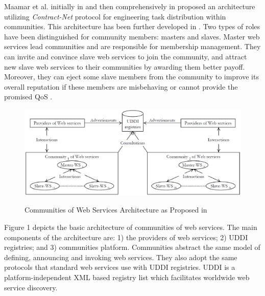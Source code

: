 Maamar et al. initially in \cite{conf/webist/MaamarLBTS07} and
then comprehensively in \cite{DBLP:journals/ijebr/MaamarSTBB09}
proposed an architecture utilizing \emph{Contract-Net} protocol
for engineering task distribution within communities. This
architecture has been further developed in
\cite{conf/IEEEscc/BenharrefSBB11, conf/IEEEscc/KhosravifarBMMT10,
conf/aina/LimTM11, CSTintercommunity}. Two types of roles have
been distinguished for community members: masters and slaves.
Master web services lead communities and are responsible for
membership management. They can invite and convince slave web
services to join the community, and attract new slave web services
to their communities by awarding them better payoff. Moreover,
they can eject some slave members from the community to improve
its overall reputation if these members are misbehaving or cannot
provide the promised QoS \cite{DBLP:journals/ijebr/MaamarSTBB09}.

        \begin{figure}
            \begin{center}
            \includegraphics[width=16cm]{Figures/wsarch.eps}\label{wsarch}
            \caption{Communities of Web Services Architecture as Proposed in \cite{DBLP:journals/ijebr/MaamarSTBB09}}
            \end{center}
        \end{figure}

Figure 1 %
depicts the basic architecture of
communities of web services. The main components of the
architecture are: 1) the providers of web services; 2) UDDI
registries; and 3) communities platform. Communities abstract the
same model of defining, announcing and invoking web services. They
also adopt the same protocols that standard web services use with
UDDI registries. UDDI is a platform-independent XML based registry
list which facilitates worldwide web service discovery.

